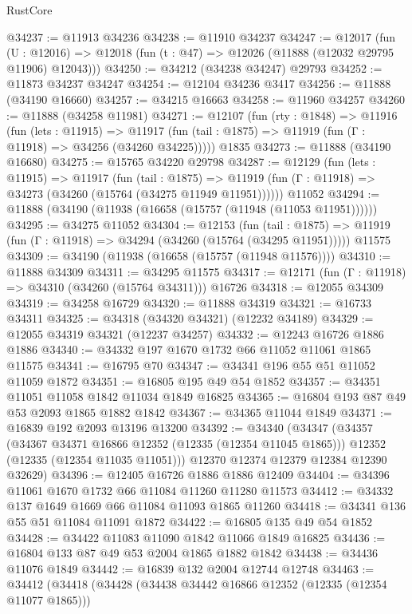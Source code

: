 \begin{lexlean}{RustCore}
\begin{coremodule}
@34237 := @11913 @34236
@34238 := @11910 @34237
@34247 := @12017
    (fun (U : @12016) => @12018 (fun (t : @47) => @12026 (@11888 (@12032 @29795 @11906) @12043)))
@34250 := @34212 (@34238 @34247) @29793
@34252 := @11873 @34237 @34247
@34254 := @12104 @34236 @3417
@34256 := @11888 (@34190 @16660)
@34257 := @34215 @16663
@34258 := @11960 @34257
@34260 := @11888 (@34258 @11981)
@34271 := @12107
    (fun (rty : @1848) =>
    @11916
      (fun (lets : @11915) =>
      @11917 (fun (tail : @1875) => @11919 (fun (Γ : @11918) => @34256 (@34260 @34225)))))
    @1835
@34273 := @11888 (@34190 @16680)
@34275 := @15765 @34220 @29798
@34287 := @12129
    (fun (lets : @11915) =>
    @11917
      (fun (tail : @1875) =>
      @11919 (fun (Γ : @11918) => @34273 (@34260 (@15764 (@34275 @11949 @11951))))))
    @11052
@34294 := @11888 (@34190 (@11938 (@16658 (@15757 (@11948 (@11053 @11951))))))
@34295 := @34275 @11052
@34304 := @12153
    (fun (tail : @1875) => @11919 (fun (Γ : @11918) => @34294 (@34260 (@15764 (@34295 @11951)))))
    @11575
@34309 := @34190 (@11938 (@16658 (@15757 (@11948 @11576))))
@34310 := @11888 @34309
@34311 := @34295 @11575
@34317 := @12171 (fun (Γ : @11918) => @34310 (@34260 (@15764 @34311))) @16726
@34318 := @12055 @34309
@34319 := @34258 @16729
@34320 := @11888 @34319
@34321 := @16733 @34311
@34325 := @34318 (@34320 @34321) (@12232 @34189)
@34329 := @12055 @34319 @34321 (@12237 @34257)
@34332 := @12243 @16726 @1886 @1886
@34340 := @34332 @197 @1670 @1732 @66 @11052 @11061 @1865 @11575
@34341 := @16795 @70
@34347 := @34341 @196 @55 @51 @11052 @11059 @1872
@34351 := @16805 @195 @49 @54 @1852
@34357 := @34351 @11051 @11058 @1842 @11034 @1849 @16825
@34365 := @16804 @193 @87 @49 @53 @2093 @1865 @1882 @1842
@34367 := @34365 @11044 @1849
@34371 := @16839 @192 @2093 @13196 @13200
@34392 := @34340
    (@34347
      (@34357
        (@34367 @34371 @16866 @12352 (@12335 (@12354 @11045 @1865)))
        @12352
        (@12335 (@12354 @11035 @11051)))
      @12370
      @12374
      @12379
      @12384
      @12390
      @32629)
@34396 := @12405 @16726 @1886 @1886 @12409
@34404 := @34396 @11061 @1670 @1732 @66 @11084 @11260 @11280 @11573
@34412 := @34332 @137 @1649 @1669 @66 @11084 @11093 @1865 @11260
@34418 := @34341 @136 @55 @51 @11084 @11091 @1872
@34422 := @16805 @135 @49 @54 @1852
@34428 := @34422 @11083 @11090 @1842 @11066 @1849 @16825
@34436 := @16804 @133 @87 @49 @53 @2004 @1865 @1882 @1842
@34438 := @34436 @11076 @1849
@34442 := @16839 @132 @2004 @12744 @12748
@34463 := @34412
    (@34418
      (@34428
        (@34438 @34442 @16866 @12352 (@12335 (@12354 @11077 @1865)))

\end{coremodule}
\end{lexlean}
